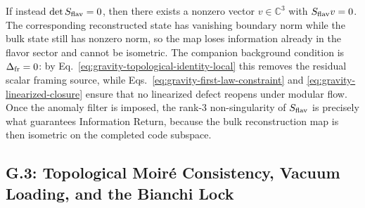 \documentclass[11pt]{article}
\begin{document}
If instead $\det S_{\rm flav}=0$, then there exists a nonzero vector
$v\in\mathbb C^3$ with $S_{\rm flav}v=0$. The corresponding reconstructed state
has vanishing boundary norm while the bulk state still has nonzero norm, so the
map loses information already in the flavor sector and cannot be isometric.
The companion background condition is $\Delta_{\rm fr}=0$: by
Eq.~\eqref{eq:gravity-topological-identity-local} this removes the residual
scalar framing source, while Eqs.~\eqref{eq:gravity-first-law-constraint} and
\eqref{eq:gravity-linearized-closure} ensure that no linearized defect reopens
under modular flow. Once the anomaly filter is imposed, the rank-$3$
non-singularity of $S_{\rm flav}$ is precisely what guarantees Information
Return, because the bulk reconstruction map is then isometric on the completed
code subspace.

\subsection*{G.3: Topological Moir\'e Consistency, Vacuum Loading, and the Bianchi Lock}
\end{document}

